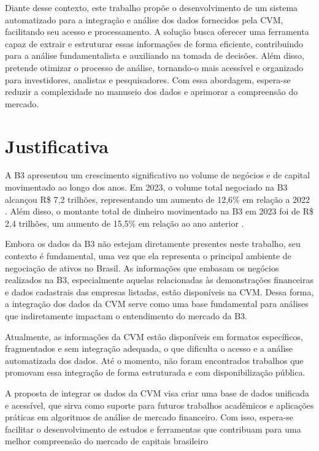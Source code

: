 Diante desse contexto, este trabalho propõe o desenvolvimento de um sistema automatizado para a integração e análise dos dados fornecidos pela CVM, facilitando seu acesso e processamento. A solução busca oferecer uma ferramenta capaz de extrair e estruturar essas informações de forma eficiente, contribuindo para a análise fundamentalista e auxiliando na tomada de decisões. Além disso, pretende otimizar o processo de análise, tornando-o mais acessível e organizado para investidores, analistas e pesquisadores. Com essa abordagem, espera-se reduzir a complexidade no manuseio dos dados e aprimorar a compreensão do mercado.

\section{Justificativa}
A B3 apresentou um crescimento significativo no volume de negócios e de capital movimentado ao longo dos anos. Em 2023, o volume total negociado na B3 alcançou R\$ 7,2 trilhões, representando um aumento de 12,6\% em relação a 2022 \cite{b3:2023:investidores}. Além disso, o montante total de dinheiro movimentado na B3 em 2023 foi de R\$ 2,4 trilhões, um aumento de 15,5\% em relação ao ano anterior \cite{b3:2023:investidores}.

Embora os dados da B3 não estejam diretamente presentes neste trabalho, seu contexto é fundamental, uma vez que ela representa o principal ambiente de negociação de ativos no Brasil. As informações que embasam os negócios realizados na B3, especialmente aquelas relacionadas às demonstrações financeiras e dados cadastrais das empresas listadas, estão disponíveis na CVM. Dessa forma, a integração dos dados da CVM serve como uma base fundamental para análises que indiretamente impactam o entendimento do mercado da B3.

Atualmente, as informações da CVM estão disponíveis em formatos específicos, fragmentados e sem integração adequada, o que dificulta o acesso e a análise automatizada dos dados. Até o momento, não foram encontrados trabalhos que promovam essa integração de forma estruturada e com disponibilização pública.

A proposta de integrar os dados da CVM visa criar uma base de dados unificada e acessível, que sirva como suporte para futuros trabalhos acadêmicos e aplicações práticas em algoritmos de análise de mercado financeiro. Com isso, espera-se facilitar o desenvolvimento de estudos e ferramentas que contribuam para uma melhor compreensão do mercado de capitais brasileiro \cite{lindman:2020:integration}

